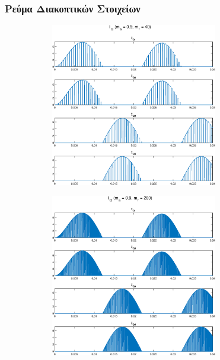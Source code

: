 \subsubsection*{Ρεύμα Διακοπτικών Στοιχείων}
\begin{figure}[h!]
	\begin{subfigure}{0.49\textwidth}
		\centering
		\includegraphics[width=0.8\textwidth]{Images/I_Q_40}
	\end{subfigure}
	\begin{subfigure}{0.49\textwidth}
		\centering
		\includegraphics[width=0.8\textwidth]{Images/I_Q_200}
	\end{subfigure}
\end{figure}

